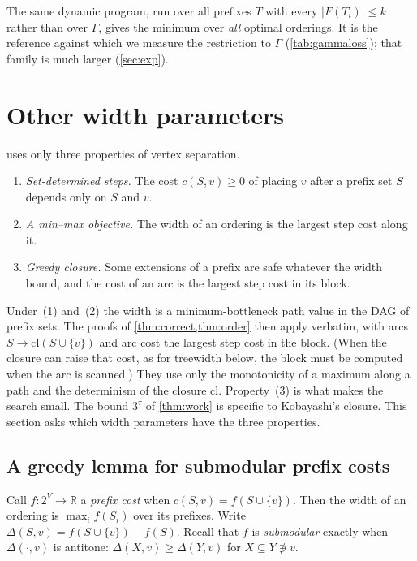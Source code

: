 \documentclass[11pt]{article}
\theoremstyle{definition}
\newcommand{\set}[1]{\{#1\}}
\begin{document}
The same dynamic program, run over all prefixes $T$ with every
$|F(T_i)|\le k$ rather than over $\Gamma$, gives the minimum over
\emph{all} optimal orderings. It is the reference against which we measure
the restriction to $\Gamma$ (\cref{tab:gammaloss}); that family is much
larger (\cref{sec:exp}).

\section{Other width parameters}\label{sec:widths}

 uses only three properties of vertex separation.
\begin{enumerate}
\item \emph{Set-determined steps.} The cost $c(S,v)\ge0$ of placing $v$
after a prefix set $S$ depends only on $S$ and $v$.
\item \emph{A min--max objective.} The width of an ordering is the largest
step cost along it.
\item \emph{Greedy closure.} Some extensions of a prefix are safe whatever
the width bound, and the cost of an arc is the largest step cost in its
block.
\end{enumerate}
Under~(1) and~(2) the width is a minimum-bottleneck path value in the DAG of
prefix sets. The proofs of \cref{thm:correct,thm:order} then apply verbatim,
with arcs $S\to\mathrm{cl}(S\cup\set v)$ and arc cost the largest step cost
in the block. (When the closure can raise that cost, as for treewidth below,
the block must be computed when the arc is scanned.) They use only the monotonicity of a maximum along a path and
the determinism of the closure $\mathrm{cl}$. Property~(3) is what makes the
search small. The bound $3^{\tau}$ of \cref{thm:work} is specific to
Kobayashi's closure. This section asks which width parameters have the
three properties.

\subsection{A greedy lemma for submodular prefix costs}\label{sec:submod}

Call $f\colon 2^V\to\mathbb{R}$ a \emph{prefix cost} when $c(S,v)=f(S\cup\set
v)$. Then the width of an ordering is $\max_i f(S_i)$ over its prefixes.
Write $\Delta(S,v)=f(S\cup\set v)-f(S)$. Recall that $f$ is
\emph{submodular} exactly when $\Delta(\cdot,v)$ is antitone:
$\Delta(X,v)\ge\Delta(Y,v)$ for $X\subseteq Y\not\ni v$.
\end{document}
